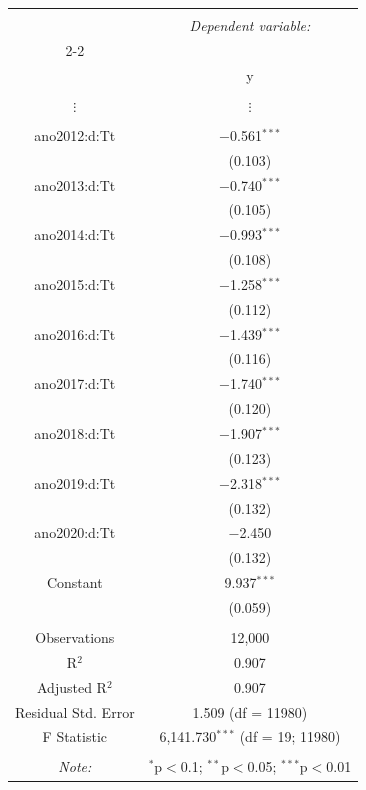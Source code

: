\documentclass[portugues]{article}
\begin{document}
\begin{boxA}
    \begingroup
        \fontsize{8pt}{12pt}\selectfont
        \begin{center}
         \begin{tabular}{@{\extracolsep{5pt}}cc} 
         \\[-1.8ex]\hline 
         \hline \\[-1.8ex] 
          & \multicolumn{1}{c}{\textit{Dependent variable:}} \\ 
         \cline{2-2} 
         \\[-1.8ex] & y \\ 
         \hline \\[-1.8ex] 
            $\vdots$ & $\vdots$ \\
            & \\
          ano2012:d:Tt & $-$0.561$^{***}$ \\ 
           & (0.103) \\ 
          ano2013:d:Tt & $-$0.740$^{***}$ \\ 
           & (0.105) \\ 
          ano2014:d:Tt & $-$0.993$^{***}$ \\ 
           & (0.108) \\ 
          ano2015:d:Tt & $-$1.258$^{***}$ \\ 
           & (0.112) \\ 
          ano2016:d:Tt & $-$1.439$^{***}$ \\ 
           & (0.116) \\ 
          ano2017:d:Tt & $-$1.740$^{***}$ \\ 
           & (0.120) \\ 
          ano2018:d:Tt & $-$1.907$^{***}$ \\ 
           & (0.123) \\ 
          ano2019:d:Tt & $-$2.318$^{***}$ \\ 
           & (0.132) \\ 
          ano2020:d:Tt & $-$2.450 \\ 
           & (0.132) \\ 
          Constant & 9.937$^{***}$ \\ 
           & (0.059) \\ 
         \hline \\[-1.8ex] 
         Observations & 12,000 \\ 
         R$^{2}$ & 0.907 \\ 
         Adjusted R$^{2}$ & 0.907 \\ 
         Residual Std. Error & 1.509 (df = 11980) \\ 
         F Statistic & 6,141.730$^{***}$ (df = 19; 11980) \\ 
         \hline 
         \hline \\[-1.8ex] 
         \textit{Note:}  & \multicolumn{1}{r}{$^{*}$p$<$0.1; $^{**}$p$<$0.05; $^{***}$p$<$0.01} \\ 
         \end{tabular} 
        \end{center}
     \endgroup


\end{boxA}
\end{document}
